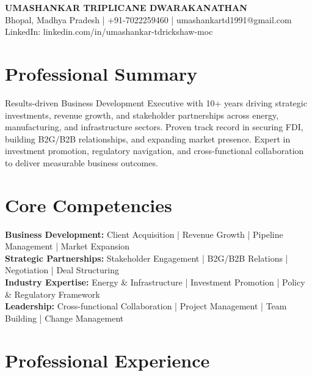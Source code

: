 \documentclass[10pt,a4paper]{article}
\begin{document}
\begin{center}
{\LARGE \textbf{UMASHANKAR TRIPLICANE DWARAKANATHAN}}\\[4pt]
Bhopal, Madhya Pradesh | +91-7022259460 | umashankartd1991@gmail.com\\
LinkedIn: linkedin.com/in/umashankar-tdrickshaw-moc
\end{center}

\vspace{3pt}

\section*{Professional Summary}
Results-driven Business Development Executive with 10+ years driving strategic investments, revenue growth, and stakeholder partnerships across energy, manufacturing, and infrastructure sectors. Proven track record in securing FDI, building B2G/B2B relationships, and expanding market presence. Expert in investment promotion, regulatory navigation, and cross-functional collaboration to deliver measurable business outcomes.

\vspace{2pt}

\section*{Core Competencies}
\textbf{Business Development:} Client Acquisition | Revenue Growth | Pipeline Management | Market Expansion\\
\textbf{Strategic Partnerships:} Stakeholder Engagement | B2G/B2B Relations | Negotiation | Deal Structuring\\
\textbf{Industry Expertise:} Energy \& Infrastructure | Investment Promotion | Policy \& Regulatory Framework\\
\textbf{Leadership:} Cross-functional Collaboration | Project Management | Team Building | Change Management

\vspace{2pt}

\section*{Professional Experience}
\end{document}
